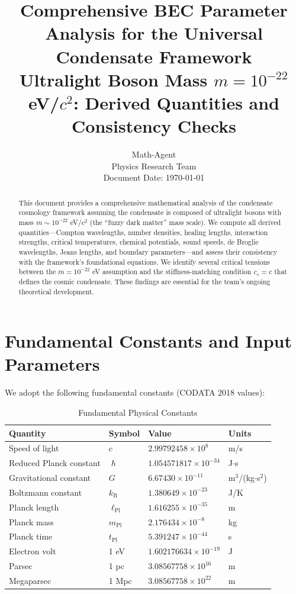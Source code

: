 \documentclass[11pt,a4paper]{article}
\title{\textbf{Comprehensive BEC Parameter Analysis for the Universal Condensate Framework}\\[0.5em]
\large Ultralight Boson Mass $m = 10^{-22}$ eV/$c^2$: Derived Quantities and Consistency Checks}
\author{Math-Agent\\
\small Physics Research Team\\
\small Document Date: \today}
\date{}
\newcommand{\ee}[1]{\times 10^{#1}}
\newcommand{\hbar}{\ensuremath{\hslash}}
\newcommand{\kB}{\ensuremath{k_{\mathrm{B}}}}
\newcommand{\lPl}{\ensuremath{\ell_{\mathrm{Pl}}}}
\newcommand{\mPl}{\ensuremath{m_{\mathrm{Pl}}}}
\newcommand{\tPl}{\ensuremath{t_{\mathrm{Pl}}}}
\begin{document}
\maketitle

\begin{abstract}
This document provides a comprehensive mathematical analysis of the condensate cosmology framework assuming the condensate is composed of ultralight bosons with mass $m \sim 10^{-22}$ eV/$c^2$ (the ``fuzzy dark matter'' mass scale). We compute all derived quantities---Compton wavelengths, number densities, healing lengths, interaction strengths, critical temperatures, chemical potentials, sound speeds, de Broglie wavelengths, Jeans lengths, and boundary parameters---and assess their consistency with the framework's foundational equations. We identify several critical tensions between the $m = 10^{-22}$ eV assumption and the stiffness-matching condition $c_s = c$ that defines the cosmic condensate. These findings are essential for the team's ongoing theoretical development.
\end{abstract}

\tableofcontents
\newpage

\section{Fundamental Constants and Input Parameters}
\label{sec:constants}

We adopt the following fundamental constants (CODATA 2018 values):

\begin{table}[H]
\centering
\caption{Fundamental Physical Constants}
\label{tab:constants}
\begin{tabular}{@{}llll@{}}
\toprule
\textbf{Quantity} & \textbf{Symbol} & \textbf{Value} & \textbf{Units} \\
\midrule
Speed of light & $c$ & $2.99792458 \ee{8}$ & m/s \\
Reduced Planck constant & $\hbar$ & $1.054571817 \ee{-34}$ & J$\cdot$s \\
Gravitational constant & $G$ & $6.67430 \ee{-11}$ & m$^3$/(kg$\cdot$s$^2$) \\
Boltzmann constant & $\kB$ & $1.380649 \ee{-23}$ & J/K \\
Planck length & $\lPl$ & $1.616255 \ee{-35}$ & m \\
Planck mass & $\mPl$ & $2.176434 \ee{-8}$ & kg \\
Planck time & $\tPl$ & $5.391247 \ee{-44}$ & s \\
Electron volt & 1 eV & $1.602176634 \ee{-19}$ & J \\
Parsec & 1 pc & $3.08567758 \ee{16}$ & m \\
Megaparsec & 1 Mpc & $3.08567758 \ee{22}$ & m \\
\bottomrule
\end{tabular}
\end{table}
\end{document}
